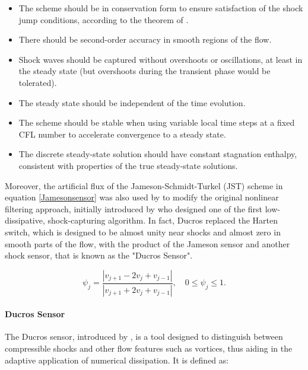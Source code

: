 \documentclass[a5paper]{sapthesis}
\begin{document}
	\begin{itemize}
		\item The scheme should be in conservation form to ensure
		satisfaction of the shock jump conditions, according to the theorem of \citet{LAXWENDROFF}.
		\item There should be second-order accuracy in smooth regions of
		the flow.
		\item Shock waves should be captured without overshoots or
		oscillations, at least in the steady state (but overshoots during the
		transient phase would be tolerated).
		\item The steady state should be independent of the time evolution.
		\item The scheme should be stable when using variable local time steps
		at a fixed CFL number to accelerate convergence to a steady state.
		\item The discrete steady-state solution should have constant
		stagnation enthalpy, consistent with properties of the true steady-state
		solutions. 
	\end{itemize}
	
	\noindent Moreover, the artiﬁcial ﬂux of the Jameson-Schmidt-Turkel (JST) scheme in equation \ref{Jamesonsensor} was also used by \citet{DUCROS1999} to modify the original nonlinear ﬁltering approach, initially introduced by \citet{YEE1999199} who designed one of the first low-dissipative, shock-capturing algorithm. In fact, Ducros replaced the Harten \cite{HARTEN1983} switch, which is designed to be almost unity near shocks and almost zero in smooth parts of the ﬂow, with the product of the Jameson sensor and another shock sensor, that is known as the "Ducros Sensor".
	
	\begin{equation}
		\psi_{j}= \dfrac{|v_{j+1}-2v_{j}+v_{j-1}|}{|v_{j+1}+2v_{j}+v_{j-1}|}, \quad 0 \leq \psi_{j} \leq 1.
		\label{Jamesonsensor}
	\end{equation}
	
	\paragraph{Ducros Sensor} 
	The Ducros sensor, introduced by \citet{DUCROS1999}, is a tool designed to distinguish between compressible shocks and other flow features such as vortices, thus aiding in the adaptive application of numerical dissipation. It is defined as:
	
\end{document}
